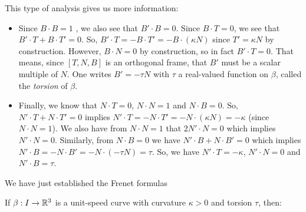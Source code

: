 This type of analysis gives us more information:
\begin{itemize}
\item Since $B \cdot B = 1$ , we also see that $B' \cdot B = 0$. Since
  $B \cdot T = 0$, we see that $B' \cdot T + B \cdot T' = 0$. So, $B'
  \cdot T = -B \cdot T' = -B \cdot (\kappa N)$ since $T' = \kappa N$
  by construction. However, $B \cdot N = 0$ by construction, so in
  fact $B' \cdot T = 0$. 
That means, since $[T, N, B]$ is an orthogonal frame, that $B'$ must
be a scalar multiple of $N$. One writes $B' = -\tau N$ with $\tau$ a
real-valued function on $\beta$, called the \textit{torsion} of
$\beta$.
\item Finally, we know that $N \cdot T = 0$, $N \cdot N = 1$ and $N
  \cdot B = 0$. So, $N' \cdot T + N \cdot T' = 0$ implies $N' \cdot T
 = -N \cdot T' = -N \cdot (\kappa N) = -\kappa$ (since $N \cdot N =
 1$). We also have from $N \cdot N = 1$ that $2 N' \cdot N = 0$ which
 implies $N' \cdot N = 0$. Similarly, from $N \cdot B = 0$ we have $N'
 \cdot B + N \cdot B' = 0$ which implies $N' \cdot B = -N \cdot B' =
 -N \cdot (-\tau N) = \tau$. So, we have $N' \cdot T = -\kappa$, $N'
 \cdot N = 0$ and $N' \cdot B = \tau$.
\end{itemize}

We have just established the Frenet formulas
\begin{theorem}
  If $\beta: I \rightarrow \mathbb{R}^3$ is a unit-speed curve with
  curvature $\kappa  > 0$ and torsion $\tau$, then:
\end{theorem}


